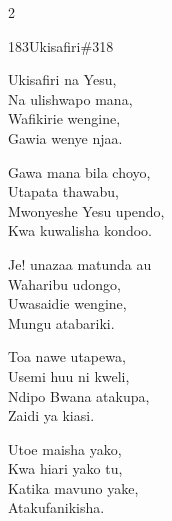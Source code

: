 \begin{multicols}{2}
\begin{hymn}{183}{Ukisafiri}{\#318}
\begin{stanza}
Ukisafiri na Yesu,\\
Na ulishwapo mana,\\
Wafikirie wengine,\\
Gawia wenye njaa.
\end{stanza}
\begin{chorus}
Gawa mana bila choyo,\\
Utapata thawabu,\\
Mwonyeshe Yesu upendo,\\
Kwa kuwalisha kondoo.
\end{chorus}
\begin{stanza}
Je! unazaa matunda au\\
Waharibu udongo,\\
Uwasaidie wengine,\\
Mungu atabariki.
\end{stanza}
\begin{stanza}
Toa nawe utapewa,\\
Usemi huu ni kweli,\\
Ndipo Bwana atakupa,\\
Zaidi ya kiasi.
\end{stanza}
\begin{stanza}
Utoe maisha yako,\\
Kwa hiari yako tu,\\
Katika mavuno yake,\\
Atakufanikisha.
\end{stanza}
\end{hymn}


\end{multicols}
